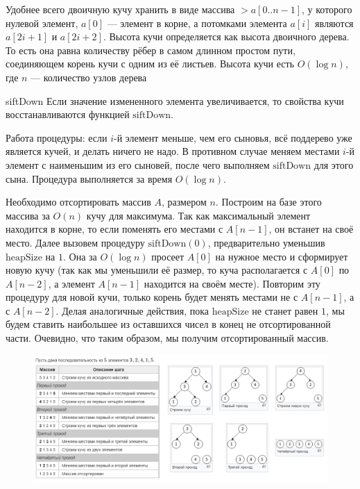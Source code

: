 \documentclass[discrete.tex]{subfiles}
\begin{document}
\begin{enumerate}
\begin{definition}
      Удобнее всего двоичную кучу хранить в виде массива $>a[0..n-1]$, у которого нулевой элемент, $a[0]$ — элемент в корне, а потомками элемента $a[i]$ являются $a[2i+1]$ и $a[2i+2]$. Высота кучи определяется как высота двоичного дерева. То есть она равна количеству рёбер в самом длинном простом пути, соединяющем корень кучи с одним из её листьев. Высота кучи есть $O(\log{n})$, где $n$ — количество узлов дерева
    \end{definition}

    \begin{definition}{siftDown}
      Если значение измененного элемента увеличивается, то свойства кучи восстанавливаются функцией $ \mathrm {siftDown} $.

      Работа процедуры: если $i$-й элемент меньше, чем его сыновья, всё поддерево уже является кучей, и делать ничего не надо. В противном случае меняем местами $i$-й элемент с наименьшим из его сыновей, после чего выполняем $ \mathrm {siftDown} $ для этого сына.
      Процедура выполняется за время $O(\log{n})$.
    \end{definition}

    \begin{alg}
      Необходимо отсортировать массив $A$, размером $n$. Построим на базе этого массива за $O(n)$ кучу для максимума. Так как максимальный элемент находится в корне, то если поменять его местами с $A[n - 1]$, он встанет на своё место. Далее вызовем процедуру $ \mathrm{siftDown(0)} $, предварительно уменьшив $ \mathrm{heapSize} $ на $1$. Она за $O(\log{n})$ просеет $A[0]$ на нужное место и сформирует новую кучу (так как мы уменьшили её размер, то куча располагается с $A[0]$ по $A[n - 2]$, а элемент $A[n-1]$ находится на своём месте). Повторим эту процедуру для новой кучи, только корень будет менять местами не с $A[n - 1]$, а с $A[n-2]$.
      Делая аналогичные действия, пока $\mathrm{heapSize} $ не станет равен $1$, мы будем ставить наибольшее из оставшихся чисел в конец не отсортированной части. Очевидно, что таким образом, мы получим отсортированный массив.

      \begin{figure}[H]
          \includegraphics[width=15cm]{pics/30_2.png}
          \centering
      \end{figure}
    \end{alg}
  \end{enumerate}
\end{document}
